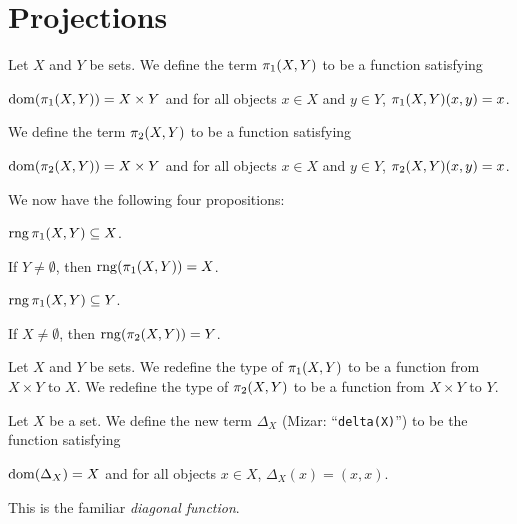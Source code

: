 \documentclass{article}
\begin{document}
\section{Projections}

\begin{definition}
Let $X$ and $Y$ be sets.
We define the term $\pi_{1}(X, Y)$ to be a function satisfying
\begin{defn}
\item $\operatorname{dom}(\pi_{1}(X, Y))=X\times Y$ and for all objects $x\in X$ and
  $y\in Y$, $\pi_{1}(X, Y)(x,y)=x$.
\end{defn}
We define the term $\pi_{2}(X, Y)$ to be a function satisfying
\begin{defn}
\item $\operatorname{dom}(\pi_{2}(X, Y))=X\times Y$ and for all objects $x\in X$ and
  $y\in Y$, $\pi_{2}(X, Y)(x,y)=x$.
\end{defn}
\end{definition}

We now have the following four propositions:
\begin{thm}
\item\label{funct3:43} $\operatorname{rng}\pi_{1}(X, Y)\subseteq X$.
\item\label{funct3:44} If $Y\neq\emptyset$, then $\operatorname{rng}(\pi_{1}(X, Y))=X$.
\item\label{funct3:45} $\operatorname{rng}\pi_{1}(X, Y)\subseteq Y$.
\item\label{funct3:46} If $X\neq\emptyset$, then $\operatorname{rng}(\pi_{2}(X, Y))=Y$.
\end{thm}

\begin{definition}
Let $X$ and $Y$ be sets.
We redefine the type of $\pi_{1}(X, Y)$ to be a function from $X\times Y$
to $X$.
We redefine the type of $\pi_{2}(X, Y)$ to be a function from $X\times Y$
to $Y$.
\end{definition}

\begin{definition}
Let $X$ be a set.
We define the new term $\Delta_{X}$ (Mizar: ``\verb#delta(X)#'') to be
the function satisfying
\begin{defn}
\item $\operatorname{dom}(\Delta_{X})=X$ and for all objects $x\in X$, $\Delta_{X}(x)=(x,x)$.
\end{defn}
\end{definition}

\begin{remark}
This is the familiar \emph{diagonal function}.
\end{remark}
\end{document}
